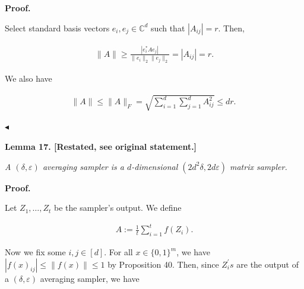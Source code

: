 \documentclass[10pt,a4paper]{article}
\begin{document}



\par\medskip\noindent\textbf{Proof.}\par




Select standard basis vectors $e_{i},e_{j}\in\mathbb{C}^{d}$ such that $|A_{ij}|=r$. Then,\par


\[\begin{gathered}
\|A\|\geq\frac{|e_{i}^{*}Ae_{j}|}{\|e_{i}\|_{2}\|e_{j}\|_{2}}=|A_{ij}|=r.
\end{gathered}\]


We also have\par


\[\begin{gathered}
\|A\|\leq\|A\|_{F}=\sqrt{\sum_{i=1}^{d}\sum_{j=1}^{d}A_{ij}^{2}}\leq dr.\
\end{gathered}\]


$\blacktriangleleft$\par






\par\medskip\noindent\textbf{
\textbf{Lemma 17}\textbf{.}
[Restated, see original statement.]}\par



\emph{A $(\delta,\varepsilon)$ averaging sampler is a $d$-dimensional $(2d^{2}\delta,2d\varepsilon)$ matrix sampler.}\par








\par\medskip\noindent\textbf{Proof.}\par




Let $Z_{1},\dots,Z_{t}$ be the sampler’s output. We define\par


\[\begin{gathered}
A:=\frac{1}{t}\sum_{i=1}^{t}f(Z_{i}).
\end{gathered}\]


Now we fix some $i,j\in[d]$. For all $x\in\{0,1\}^{m}$, we have $|f(x)_{ij}|\leq\left\lVert f(x)\right\rVert\leq 1$ by Proposition 40. Then, since $Z_{i}^{\prime}s$ are the output of a $(\delta,\varepsilon)$ averaging sampler, we have\par
\end{document}

